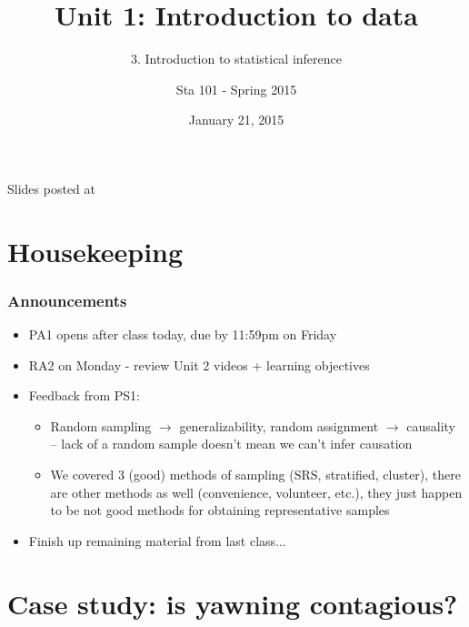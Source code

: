 \documentclass[slidestop,compress,mathserif,12pt,t,professionalfonts,xcolor=table]{beamer}
\title{Unit 1: Introduction to data}
\subtitle{3. Introduction to statistical inference}
\author{Sta 101 - Spring 2015}
\date{January 21, 2015}
\institute{Duke University, Department of Statistical Science}
\begin{document}



\begin{frame}[plain]

\titlepage
\vfill
{\scriptsize {} \hfill Slides posted at  \webLink{\CourseSite}{\CourseSite}}
\addtocounter{framenumber}{-1} 

\end{frame}


\section{Housekeeping}


\begin{frame}
\frametitle{Announcements}

\begin{itemize}

\item PA1 opens after class today, due by 11:59pm on Friday

\item RA2 on Monday - review Unit 2 videos + learning objectives

\item Feedback from PS1:
\begin{itemize}
\item Random sampling $\rightarrow$ generalizability, random assignment $\rightarrow$ causality -- lack of a random sample doesn't mean we can't infer causation
\item We covered 3 (good) methods of sampling (SRS, stratified, cluster), there are other methods as well (convenience, volunteer, etc.), they just happen to be not good methods for obtaining representative samples
\end{itemize}

\item Finish up remaining material from last class...

\end{itemize}

\end{frame}


\section{Case study: is yawning contagious?}
\end{document}
